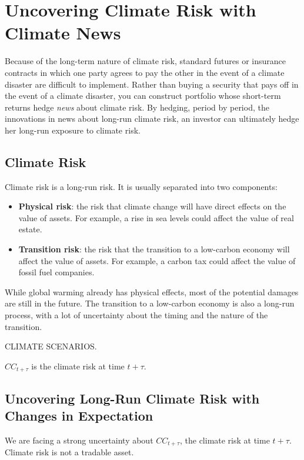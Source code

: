 \chapter{Uncovering Climate Risk with Climate News}

Because of the long-term nature of climate risk,
standard futures or insurance 
contracts in which one party agrees 
to pay the other in the event of a climate 
disaster are difficult to implement. 
Rather than buying a security that pays off
in the event of a climate disaster, 
you can construct 
portfolio whose short-term returns hedge
\textit{news} about climate risk.
By hedging, period by period, the innovations 
in news about long-run climate risk, 
an investor can ultimately hedge her 
long-run exposure to climate risk.

\section{Climate Risk}

Climate risk is a long-run risk.
It is usually separated into two components:
\begin{itemize}
    \item \textbf{Physical risk}: the risk that 
    climate change will have direct effects on 
    the value of assets. For example, 
    a rise in sea levels could affect the value 
    of real estate.
    \item \textbf{Transition risk}: the risk that 
    the transition to a low-carbon economy will 
    affect the value of assets. For example, 
    a carbon tax could affect the value of 
    fossil fuel companies.
\end{itemize}

While global warming already has physical effects,
most of the potential damages are still in the future.
The transition to a low-carbon economy is also
a long-run process, with a lot of uncertainty
about the timing and the nature of the transition.

CLIMATE SCENARIOS.

$CC_{t+\tau}$ is the climate risk at time $t+\tau$.

\section{Uncovering Long-Run Climate Risk
with Changes in Expectation}

We are facing a strong uncertainty about 
$CC_{t+\tau}$, the climate risk at time $t+\tau$. 
Climate risk is not a tradable asset.

